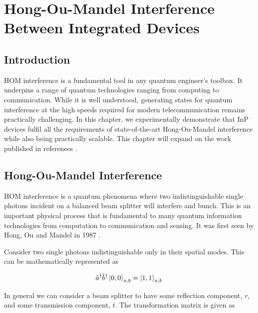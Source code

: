 %
%
\graphicspath{{./chapters/chapter03/fig03/}}

\let\textcircled=\pgftextcircled
\chapter[HOM Interference Between Integrated Devices]{Hong-Ou-Mandel Interference Between Integrated Devices}
\label{chap:hom}

\section{Introduction}

\ac{HOM} interference is a fundamental tool in any quantum engineer's toolbox. It underpins a range of quantum technologies ranging from computing to communication. While it is well understood, generating states for quantum interference at the high speeds required for modern telecommunication remains practically challenging. In this chapter, we experimentally demonstrate that \ac{InP} devices fulfil all the requirements of state-of-the-art Hong-Ou-Mandel interference while also being practically scalable. This chapter will expand on the work published in references \cite{semenenko2019}. 

\section{Hong-Ou-Mandel Interference}

\Ac{HOM} interference is a quantum phenomena where two indistinguishable single photons incident on a balanced beam splitter will interfere and bunch. This is an important physical process that is fundamental to many quantum information technologies from computation to communication and sensing. It was first seen by Hong, Ou and Mandel in 1987 \cite{HOM}. 

Consider two single photons indistinguishable only in their spatial modes. This can be mathematically represented as 

\begin{equation}
	\hat{a}^\dagger \hat{b}^\dagger \ket{0,0}_{a,b} = \ket{1,1}_{a,b}
\end{equation}

In general we can consider a beam splitter to have some reflection component, $r$, and some transmission component, $t$. The transformation matrix is given as 

